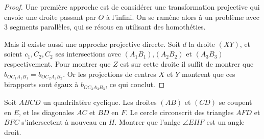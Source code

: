 \begin{proof}

Une première approche est de considérer une transformation projective qui envoie une droite passant par $O$ à l'infini. On se ramène alors à un problème avec $3$ segments parallèles, qui se résous en utilisant des homothéties.

\medskip

Mais il existe aussi une approche projective directe. Soit $d$ la droite $(XY)$, et soient $c_1,C_2,C_2$ ses intersections avec $(A_1B_1)$,$(A_2B_2)$ et $(A_3B_3)$ respectivement. Pour montrer que $Z$ est sur cette droite il suffit de montrer que $b_{OC_1A_1B_1}=b_{OC_2A_2B_2}$. Or les projections de centres $X$ et $Y$ montrent que ces birapports sont égaux à $b_{OC_3A_3B_3}$, ce qui conclut.
\end{proof}

\begin{exo}%
Soit $ABCD$ un quadrilatère cyclique. Les droites $(AB)$ et $(CD)$ se coupent en $E$, et les diagonales $AC$ et $BD$ en $F$. Le cercle circonscrit des triangles $AFD$ et $BFC$ s'intersectent à nouveau en $H$. Montrer que l'anlge $\angle EHF$ est un angle droit.
\end{exo}

